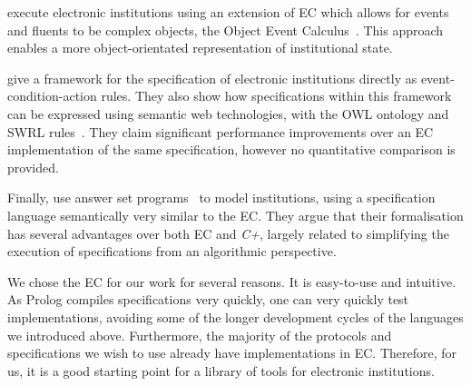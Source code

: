\citet{Tampitsikas2011} execute electronic institutions using an extension 
of \ac{EC} which allows for events and fluents to be complex objects, the 
Object Event Calculus~\citep{Kesim1996}. This approach enables a more 
object-orientated representation of institutional state.



\citet{Fornara2008} give a framework for the specification of electronic
institutions directly as event-condition-action rules. They also show how
specifications within this framework can be expressed using semantic web
technologies, with the OWL ontology and SWRL rules~\citep{Fornara2010}. They claim significant
performance improvements over an \ac{EC} implementation of the same
specification, however no quantitative comparison is provided. %

Finally, \citet{Cliffe2006} use answer set programs~\citep{Baral2003} to model
institutions, using a specification language semantically very similar to the
\ac{EC}. They argue that their formalisation has several advantages over both
\ac{EC} and \emph{C+}, largely related to simplifying the execution of
specifications from an algorithmic perspective.

We chose the \ac{EC} for our work for several reasons. It is easy-to-use and
intuitive. As Prolog compiles specifications very quickly, one can very
quickly test implementations, avoiding some of the longer development cycles of the languages
we introduced above. Furthermore, the majority of the protocols and
specifications we wish to use already have implementations in \ac{EC}.
Therefore, for us, it is a good starting point for a library of tools for
electronic institutions.



